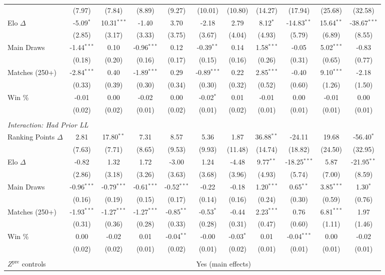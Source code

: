 \begin{tabular}{lcccccccccc}
 & (7.97) & (7.84) & (8.89) & (9.27) & (10.01) & (10.80) & (14.27) & (17.94) & (25.68) & (32.58) \\[0.3em]
\quad Elo $\Delta$ & -5.09$^{*}$ & 10.31$^{***}$ & -1.40 & 3.70 & -2.18 & 2.79 & 8.12$^{*}$ & -14.83$^{**}$ & 15.64$^{**}$ & -38.67$^{***}$ \\
 & (2.85) & (3.17) & (3.33) & (3.75) & (3.67) & (4.04) & (4.93) & (5.79) & (6.89) & (8.55) \\[0.3em]
\quad Main Draws & -1.44$^{***}$ & 0.10 & -0.96$^{***}$ & 0.12 & -0.39$^{**}$ & 0.14 & 1.58$^{***}$ & -0.05 & 5.02$^{***}$ & -0.83 \\
 & (0.18) & (0.20) & (0.16) & (0.17) & (0.15) & (0.16) & (0.26) & (0.31) & (0.65) & (0.77) \\[0.3em]
\quad Matches (250+) & -2.84$^{***}$ & 0.40 & -1.89$^{***}$ & 0.29 & -0.89$^{***}$ & 0.22 & 2.85$^{***}$ & -0.40 & 9.10$^{***}$ & -2.18 \\
 & (0.33) & (0.39) & (0.30) & (0.34) & (0.30) & (0.32) & (0.52) & (0.60) & (1.26) & (1.50) \\[0.3em]
\quad Win \% & -0.01 & 0.00 & -0.02 & 0.00 & -0.02$^{*}$ & 0.01 & -0.01 & 0.00 & -0.01 & 0.00 \\
 & (0.02) & (0.02) & (0.01) & (0.02) & (0.01) & (0.02) & (0.01) & (0.01) & (0.01) & (0.01) \\[0.3em]
\\[0.3em]
\multicolumn{11}{l}{\textit{Interaction: Had Prior LL}} \\
\quad Ranking Points $\Delta$ & 2.81 & 17.80$^{**}$ & 7.31 & 8.57 & 5.36 & 1.87 & 36.88$^{**}$ & -24.11 & 19.68 & -56.40$^{*}$ \\
 & (7.63) & (7.71) & (8.65) & (9.53) & (9.93) & (11.48) & (14.74) & (18.82) & (24.50) & (32.95) \\[0.3em]
\quad Elo $\Delta$ & -0.82 & 1.32 & 1.72 & -3.00 & 1.24 & -4.48 & 9.77$^{**}$ & -18.25$^{***}$ & 5.87 & -21.95$^{**}$ \\
 & (2.86) & (3.18) & (3.26) & (3.63) & (3.68) & (3.96) & (4.93) & (5.74) & (7.00) & (8.59) \\[0.3em]
\quad Main Draws & -0.96$^{***}$ & -0.79$^{***}$ & -0.61$^{***}$ & -0.52$^{***}$ & -0.22 & -0.18 & 1.20$^{***}$ & 0.65$^{**}$ & 3.85$^{***}$ & 1.30$^{*}$ \\
 & (0.16) & (0.19) & (0.15) & (0.17) & (0.14) & (0.16) & (0.24) & (0.30) & (0.59) & (0.76) \\[0.3em]
\quad Matches (250+) & -1.93$^{***}$ & -1.27$^{***}$ & -1.27$^{***}$ & -0.85$^{**}$ & -0.53$^{*}$ & -0.44 & 2.23$^{***}$ & 0.76 & 6.81$^{***}$ & 1.97 \\
 & (0.31) & (0.36) & (0.28) & (0.33) & (0.28) & (0.31) & (0.47) & (0.60) & (1.11) & (1.46) \\[0.3em]
\quad Win \% & 0.00 & -0.02 & 0.01 & -0.04$^{**}$ & -0.00 & -0.03$^{*}$ & 0.01 & -0.04$^{***}$ & 0.00 & -0.02 \\
 & (0.02) & (0.02) & (0.01) & (0.02) & (0.01) & (0.02) & (0.01) & (0.01) & (0.01) & (0.01) \\[0.3em]
\\[0.3em]
\midrule
$Z^{\text{pre}}$ controls & \multicolumn{10}{c}{Yes (main effects)} \\
\bottomrule
\end{tabular}
